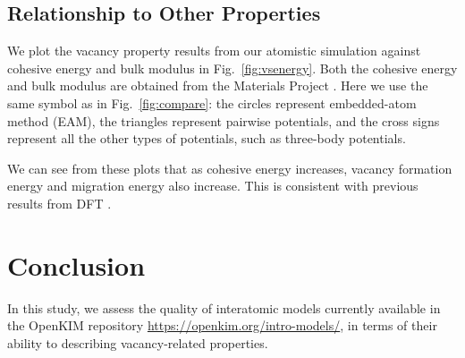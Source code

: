 \documentclass[%
 reprint,
 amsmath,amssymb,
 aps,
]{revtex4-1}
\begin{document}
\subsection{\label{sec:calcvsprop}Relationship to Other Properties}


We plot the vacancy property results from our atomistic simulation against cohesive energy and bulk modulus in Fig.~\ref{fig:vsenergy}.
Both the cohesive energy and bulk modulus are obtained from the Materials Project \cite{jain2013commentary,de2015charting}.
Here we use the same symbol as in Fig.~\ref{fig:compare}: the circles represent embedded-atom method (EAM), the triangles represent pairwise potentials, and the cross signs represent all the other types of potentials, such as three-body potentials.

We can see from these plots that as cohesive energy increases, vacancy formation energy and migration energy also increase.
This is consistent with previous results from DFT \cite{angsten2014elemental}.
%
%


\section{\label{sec:conclusion}Conclusion}

In this study, we assess the quality of interatomic models currently available in the OpenKIM repository \url{https://openkim.org/intro-models/}, in terms of their ability to describing vacancy-related properties.
\end{document}

